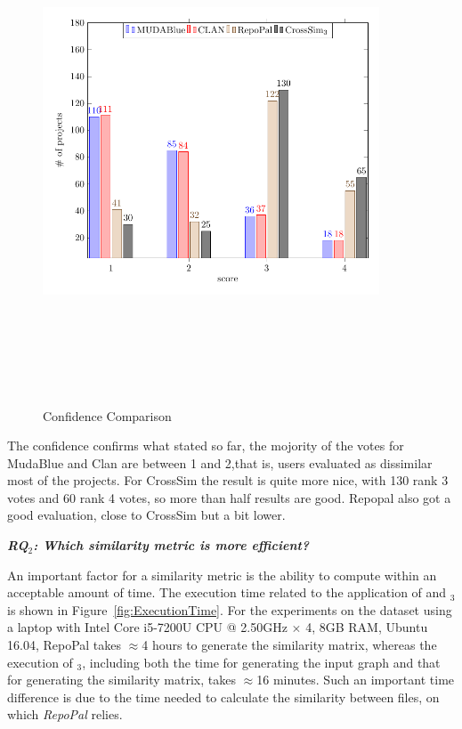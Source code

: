 \begin{figure}[!h]
\includegraphics[width=10cm,height=15cm,keepaspectratio]{images/Confidence.pdf}
\centering
\caption{Confidence Comparison}
\label{fig:Confidence}
\end{figure}

The confidence confirms what stated so far, the mojority of the votes for MudaBlue and Clan are between 1 and 2,that is, users evaluated as dissimilar most of the projects. For CrossSim the result is quite more nice, with 130 rank 3 votes and 60 rank 4 votes, so more than half results are good. Repopal also got a good evaluation, close to CrossSim but a bit lower.

\newcommand{\rqsecond}{RQ$_2$: Which similarity metric is more efficient?}\textit{\textbf{\rqsecond}} 

An important factor for a similarity metric is the ability to compute within an acceptable amount of time. The execution time related to the application of \RepoPal and \CrossSimA$_{3}$ is shown in Figure~\ref{fig:ExecutionTime}. For the experiments on the dataset using a laptop with Intel Core i5-7200U CPU @ 2.50GHz $\times$ 4, 8GB RAM, Ubuntu 16.04, RepoPal takes $\approx$4 hours to generate the similarity matrix, whereas the execution of \CrossSimA$_{3}$, including both the time for generating the input graph and that for generating the similarity matrix, takes $\approx$16 minutes. Such an important time difference is due to the time needed to calculate the similarity between  files, on which \textit{RepoPal} relies.



